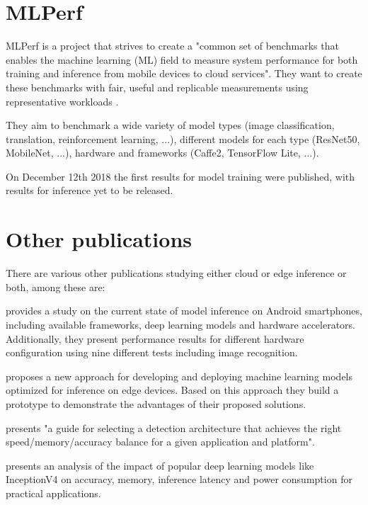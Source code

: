 \section{MLPerf}
MLPerf is a project that strives to create a "common set of benchmarks that enables the machine learning (ML) field to measure system performance for both training and inference from mobile devices to cloud services"\cite{mlperfWebsite}.
They want to create these benchmarks with fair, useful and replicable  measurements using representative workloads \cite{mlperf}. 

They aim to benchmark a wide variety of model types (image classification, translation, reinforcement learning, ...), different models for each type (ResNet50, MobileNet, ...), hardware and frameworks (Caffe2, TensorFlow Lite, ...).

On December 12th 2018 the first results for model training were published, with results for inference yet to be released.


\section{Other publications}
There are various other publications studying either cloud or edge inference or both, among these are:



\cite{DBLP:journals/corr/abs-1810-01109} provides a study on the current state of model inference on Android smartphones, including available frameworks, deep learning models and hardware accelerators. Additionally, they present performance results for different hardware configuration using nine different tests including image recognition.

\cite{rethinkingDeployment} proposes a new approach for developing and deploying machine learning models optimized for inference on edge devices. Based on this approach they build a prototype to demonstrate the advantages of their proposed solutions.


\cite{DBLP:journals/corr/HuangRSZKFFWSG016} presents "a guide for selecting a detection architecture that achieves the right
speed/memory/accuracy balance for a given application and platform"\cite{DBLP:journals/corr/HuangRSZKFFWSG016}.



\cite{DBLP:journals/corr/CanzianiPC16} presents an analysis of the impact of popular deep learning models like InceptionV4 on accuracy, memory, inference latency and power consumption for practical applications.


